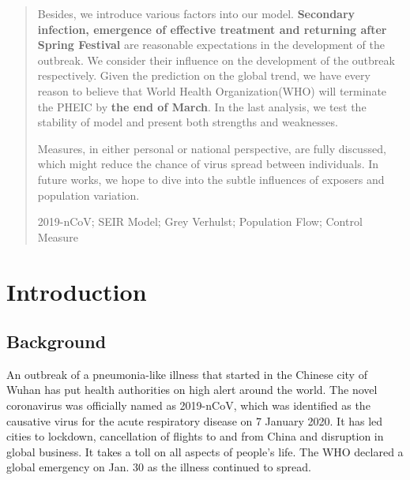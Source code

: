 \documentclass[12pt]{mcmthesis}
\begin{document}
\begin{abstract}
Besides, we introduce various factors into our model. \textbf{Secondary infection, emergence of effective treatment and returning after Spring Festival} are reasonable expectations in the development of the outbreak. We consider their influence on the development of the outbreak respectively. Given the prediction on the global trend, we have every reason to believe that World Health Organization(WHO) will terminate the PHEIC by \textbf{the end of March}. In the last analysis, we test the stability of model and present both strengths and weaknesses.

Measures, in either personal or national perspective, are fully discussed, which might reduce the chance of virus spread between individuals. In future works, we hope to dive into the subtle influences of exposers and population variation.
	
		\begin{keywords}
		 2019-nCoV; SEIR Model; Grey Verhulst; Population Flow; Control Measure
		\end{keywords}
	\end{abstract}

\maketitle

\tableofcontents

\newpage

\section{Introduction}

\subsection{Background}
An outbreak of a pneumonia-like illness that started in the Chinese city of Wuhan has put health authorities on high alert around the world. The novel coronavirus was officially named as 2019-nCoV, which was identified as the causative virus for the acute respiratory disease on 7 January 2020. It has led cities to lockdown, cancellation of flights to and from China and disruption in global business. It takes a toll on all aspects of people's life. The WHO declared a global emergency on Jan. 30 as the illness continued to spread.
\end{document}
